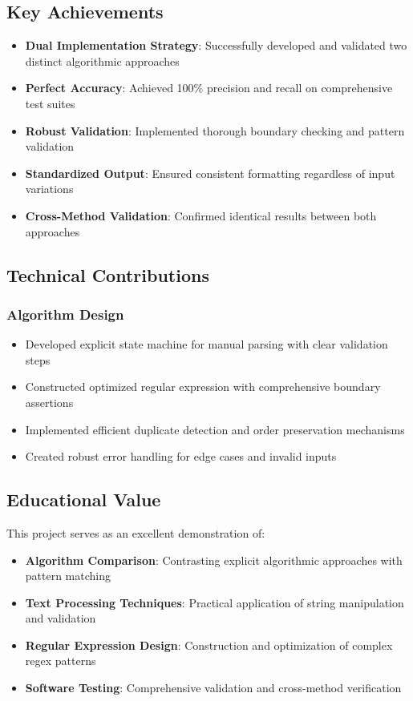 \documentclass[12pt,a4paper]{article}
\begin{document}
\subsection{Key Achievements}
\begin{itemize}
    \item \textbf{Dual Implementation Strategy}: Successfully developed and validated two distinct algorithmic approaches
    \item \textbf{Perfect Accuracy}: Achieved 100\% precision and recall on comprehensive test suites
    \item \textbf{Robust Validation}: Implemented thorough boundary checking and pattern validation
    \item \textbf{Standardized Output}: Ensured consistent formatting regardless of input variations
    \item \textbf{Cross-Method Validation}: Confirmed identical results between both approaches
\end{itemize}

\subsection{Technical Contributions}
\subsubsection{Algorithm Design}
\begin{itemize}
    \item Developed explicit state machine for manual parsing with clear validation steps
    \item Constructed optimized regular expression with comprehensive boundary assertions
    \item Implemented efficient duplicate detection and order preservation mechanisms
    \item Created robust error handling for edge cases and invalid inputs
\end{itemize}

\subsection{Educational Value}
This project serves as an excellent demonstration of:
\begin{itemize}
    \item \textbf{Algorithm Comparison}: Contrasting explicit algorithmic approaches with pattern matching
    \item \textbf{Text Processing Techniques}: Practical application of string manipulation and validation
    \item \textbf{Regular Expression Design}: Construction and optimization of complex regex patterns
    \item \textbf{Software Testing}: Comprehensive validation and cross-method verification
\end{itemize}
\end{document}
